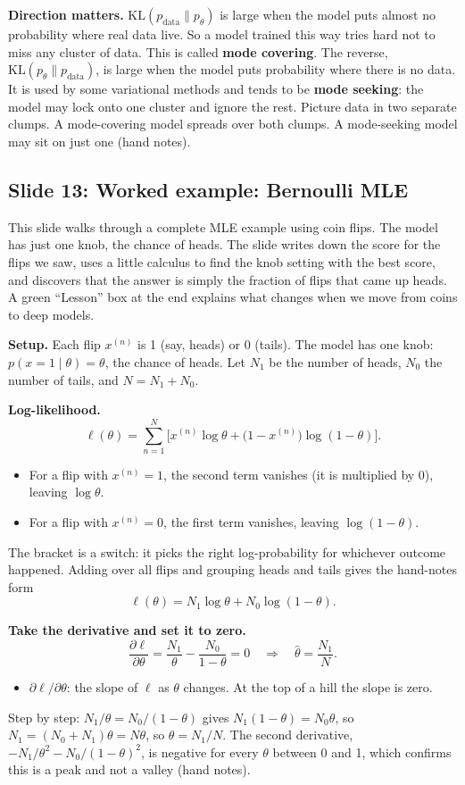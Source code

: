 \textbf{Direction matters.} $\mathrm{KL}(p_{\text{data}}\|p_\theta)$ is large when the model puts almost no probability where real data live. So a model trained this way tries hard not to miss any cluster of data. This is called \textbf{mode covering}. The reverse, $\mathrm{KL}(p_\theta\|p_{\text{data}})$, is large when the model puts probability where there is no data. It is used by some variational methods and tends to be \textbf{mode seeking}: the model may lock onto one cluster and ignore the rest. Picture data in two separate clumps. A mode-covering model spreads over both clumps. A mode-seeking model may sit on just one (hand notes).

\subsection*{Slide 13: Worked example: Bernoulli MLE}

This slide walks through a complete MLE example using coin flips. The model has just one knob, the chance of heads. The slide writes down the score for the flips we saw, uses a little calculus to find the knob setting with the best score, and discovers that the answer is simply the fraction of flips that came up heads. A green ``Lesson'' box at the end explains what changes when we move from coins to deep models.

\textbf{Setup.} Each flip $x^{(n)}$ is 1 (say, heads) or 0 (tails). The model has one knob: $p(x=1\mid\theta)=\theta$, the chance of heads. Let $N_1$ be the number of heads, $N_0$ the number of tails, and $N=N_1+N_0$.

\textbf{Log-likelihood.}
\[
\ell(\theta)=\sum_{n=1}^{N}\Big[x^{(n)}\log\theta+\big(1-x^{(n)}\big)\log(1-\theta)\Big].
\]
\begin{itemize}
\item For a flip with $x^{(n)}=1$, the second term vanishes (it is multiplied by 0), leaving $\log\theta$.
\item For a flip with $x^{(n)}=0$, the first term vanishes, leaving $\log(1-\theta)$.
\end{itemize}
The bracket is a switch: it picks the right log-probability for whichever outcome happened. Adding over all flips and grouping heads and tails gives the hand-notes form
\[
\ell(\theta)=N_1\log\theta+N_0\log(1-\theta).
\]

\textbf{Take the derivative and set it to zero.}
\[
\frac{\partial\ell}{\partial\theta}=\frac{N_1}{\theta}-\frac{N_0}{1-\theta}=0
\quad\Longrightarrow\quad
\hat\theta=\frac{N_1}{N}.
\]
\begin{itemize}
\item $\partial\ell/\partial\theta$: the slope of $\ell$ as $\theta$ changes. At the top of a hill the slope is zero.
\end{itemize}
Step by step: $N_1/\theta=N_0/(1-\theta)$ gives $N_1(1-\theta)=N_0\theta$, so $N_1=(N_0+N_1)\theta=N\theta$, so $\theta=N_1/N$. The second derivative, $-N_1/\theta^2-N_0/(1-\theta)^2$, is negative for every $\theta$ between 0 and 1, which confirms this is a peak and not a valley (hand notes).

